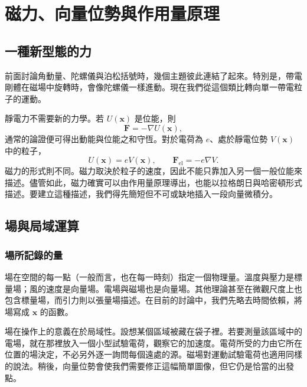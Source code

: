 \chapter{磁力、向量位勢與作用量原理}


\section{一種新型態的力}

前面討論角動量、陀螺儀與泊松括號時，幾個主題彼此連結了起來。特別是，帶電剛體在磁場中旋轉時，會像陀螺儀一樣進動。現在我們從這個類比轉向單一帶電粒子的運動。

靜電力不需要新的力學。若 \(U(\mathbf x)\) 是位能，則
\begin{equation}
  \mathbf F=-\nabla U(\mathbf x),
\end{equation}
通常的論證便可得出動能與位能之和守恆。對於電荷為 \(e\)、處於靜電位勢 \(V(\mathbf x)\) 中的粒子，
\begin{equation}
  U(\mathbf x)=eV(\mathbf x),
  \qquad
  \mathbf F_{\mathrm{el}}=-e\nabla V.
\end{equation}
磁力的形式則不同。磁力取決於粒子的速度，因此不能只靠加入另一個一般位能來描述。儘管如此，磁力確實可以由作用量原理導出，也能以拉格朗日與哈密頓形式描述。要建立這種描述，我們得先簡短但不可或缺地插入一段向量微積分。

\section{場與局域運算}

\subsection{場所記錄的量}

場在空間的每一點（一般而言，也在每一時刻）指定一個物理量。溫度與壓力是標量場；風的速度是向量場。電場與磁場也是向量場。其他理論甚至在微觀尺度上也包含標量場，而引力則以張量場描述。在目前的討論中，我們先略去時間依賴，將場寫成 \(\mathbf x\) 的函數。

場在操作上的意義在於局域性。設想某個區域被藏在袋子裡。若要測量該區域中的電場，就在那裡放入一個小型試驗電荷，觀察它的加速度。電荷所受的力由它所在位置的場決定，不必另外逐一詢問每個遠處的源。磁場對運動試驗電荷也適用同樣的說法。稍後，向量位勢會使我們需要修正這幅簡單圖像，但它仍是恰當的出發點。

